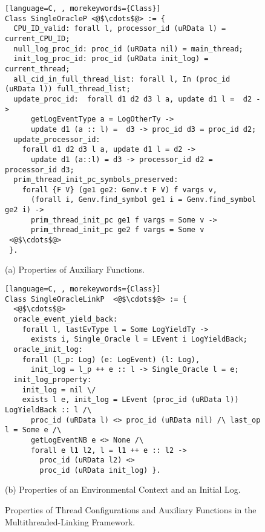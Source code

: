 \begin{figure}
\begin{lstlisting}[language=C, , morekeywords={Class}]
Class SingleOracleP <@$\cdots$@> := {
  CPU_ID_valid: forall l, processor_id (uRData l) = current_CPU_ID;
  null_log_proc_id: proc_id (uRData nil) = main_thread;
  init_log_proc_id: proc_id (uRData init_log) = current_thread;
  all_cid_in_full_thread_list: forall l, In (proc_id (uRData l)) full_thread_list;
  update_proc_id:  forall d1 d2 d3 l a, update d1 l =  d2 ->
      getLogEventType a = LogOtherTy ->
      update d1 (a :: l) =  d3 -> proc_id d3 = proc_id d2;
  update_processor_id:
    forall d1 d2 d3 l a, update d1 l = d2 -> 
      update d1 (a::l) = d3 -> processor_id d2 = processor_id d3;   
  prim_thread_init_pc_symbols_preserved:
    forall {F V} (ge1 ge2: Genv.t F V) f vargs v,
      (forall i, Genv.find_symbol ge1 i = Genv.find_symbol ge2 i) ->
      prim_thread_init_pc ge1 f vargs = Some v ->
      prim_thread_init_pc ge2 f vargs = Some v
 <@$\cdots$@>      
 }.
\end{lstlisting}
\begin{center}
(a) Properties of Auxiliary Functions.
\end{center}

\begin{lstlisting}[language=C, , morekeywords={Class}]
Class SingleOracleLinkP  <@$\cdots$@> := {
  <@$\cdots$@>
  oracle_event_yield_back:
    forall l, lastEvType l = Some LogYieldTy ->
      exists i, Single_Oracle l = LEvent i LogYieldBack;
  oracle_init_log:
    forall (l_p: Log) (e: LogEvent) (l: Log),
      init_log = l_p ++ e :: l -> Single_Oracle l = e;
  init_log_property:
    init_log = nil \/
    exists l e, init_log = LEvent (proc_id (uRData l)) LogYieldBack :: l /\
      proc_id (uRData l) <> proc_id (uRData nil) /\ last_op l = Some e /\
      getLogEventNB e <> None /\
      forall e l1 l2, l = l1 ++ e :: l2 ->
        proc_id (uRData l2) <> 
        proc_id (uRData init_log) }.
\end{lstlisting}
\begin{center}
(b) Properties of an Environmental Context and an Initial Log.
\end{center}
\caption{Properties of Thread Configurations and Auxiliary Functions in the Multithreaded-Linking Framework.}	
\label{fig:chapter:conlink:multithreaded-configuration-props}
\end{figure}

